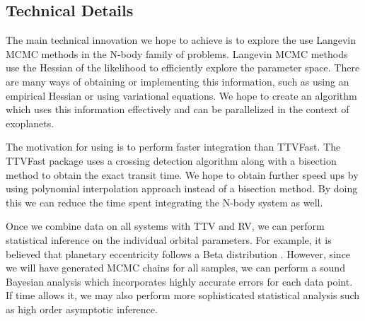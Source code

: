 \subsection{Technical Details}
The main technical innovation we hope to achieve is to explore the use Langevin MCMC methods in the N-body family of problems. 
Langevin MCMC methods use the Hessian of the likelihood to efficiently explore the parameter space. 
There are many ways of obtaining or implementing this information, such as using an empirical Hessian or using variational equations. 
We hope to create an algorithm which uses this information effectively and can be parallelized in the context of exoplanets.

The motivation for using \reb is to perform faster integration than TTVFast.
The TTVFast package uses a crossing detection algorithm along with a bisection method to obtain the exact transit time.
We hope to obtain further speed ups by using polynomial interpolation approach instead of a bisection method.
By doing this we can reduce the time spent integrating the N-body system as well.

Once we combine data on all systems with TTV and RV, we can perform statistical inference on the individual orbital parameters.
For example, it is believed that planetary eccentricity follows a Beta distribution \cite{kipping2013parametrizing}.
However, since we will have generated MCMC chains for all samples, we can perform a sound Bayesian analysis which incorporates highly accurate errors for each data point.
If time allows it, we may also perform more sophisticated statistical analysis such as high order asymptotic inference.